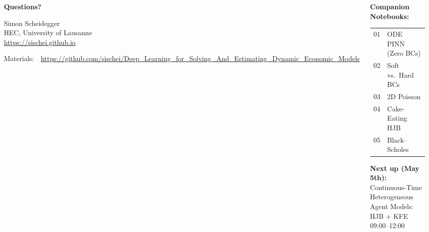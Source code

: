 \documentclass[aspectratio=169,11pt]{beamer}
\begin{document}
\begin{frame}{}
\begin{columns}[c]
\begin{center}
{\Huge \textcolor{uzhblue}{\textbf{Questions?}}}

\vspace{1.0cm}
{\large Simon Scheidegger}\\[4pt]
{\small HEC, University of Lausanne}\\[4pt]
\url{https://sischei.github.io}

\vspace{0.6cm}
{\small Materials:~~\url{https://github.com/sischei/Deep_Learning_for_Solving_And_Estimating_Dynamic_Economic_Models}}
\end{center}

\begin{center}
\textbf{Companion Notebooks:}\\[8pt]
{\small
\begin{tabular}{rl}
01 & ODE PINN (Zero BCs) \\
02 & Soft vs.\ Hard BCs \\
03 & 2D Poisson \\
04 & Cake-Eating HJB \\
05 & Black--Scholes \\
\end{tabular}
}

\vspace{0.8cm}
\textbf{Next up (May 5th):}\\[6pt]
{\large Continuous-Time Heterogeneous}\\
{\large Agent Models: HJB + KFE}\\[8pt]
{\small 09:00--12:00}
\end{center}
\end{columns}
\end{frame}
\end{document}
